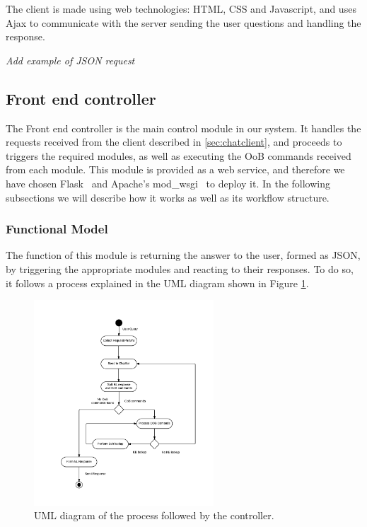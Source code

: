 The client is made using web technologies: HTML, CSS and Javascript, and uses Ajax to communicate with the server sending the user questions and handling the response.

\emph{Add example of JSON request}



\subsection{Front end controller}

The Front end controller is the main control module in our system. It handles the requests received from the client described in \ref{sec:chatclient}, and proceeds to triggers the required modules, as well as executing the \ac{OoB} commands received from each module. This module is provided as a web service, and therefore we have chosen Flask~\cite{flask0101} and Apache's mod\_wsgi~\cite{modwsgi} to deploy it. In the following subsections we will describe how it works as well as its workflow structure.

\subsubsection{Functional Model}

The function of this module is returning the answer to the user, formed as JSON, by triggering the appropriate modules and reacting to their responses. To do so, it follows a process explained in the UML diagram shown in Figure \ref{fig:fe-model1}.

\begin{figure}[!htbp]
    \centering
    \includegraphics[width=0.6\textwidth]{img/prot/activityDiagram.png} 
    \caption{UML diagram of the process followed by the controller.}
    \label{fig:fe-model1}
\end{figure}

